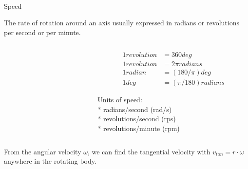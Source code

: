 \subsection{}
{
\begin{frame}{Speed}

The rate of rotation around an axis usually expressed 
in radians or revolutions per second or per minute.

\begin{columns}
\begin{column}{0.5\textwidth}  %

	\vspace{-3mm}
   	\begin{figure}
 	\end{figure}

\end{column}

\begin{column}{0.5\textwidth}
\begin{equation*}
\begin{split}
1 revolution & = 360 deg \\
1 revolution & = 2 \pi radians \\
1 radian & = (180/ \pi) deg \\
1 deg & = (\pi / 180) radians
\end{split}
\end{equation*}

Units of speed: \\
* radians/second (rad/s) \\
* revolutions/second (rps) \\
* revolutions/minute (rpm) 
\end{column}


\end{columns}


From the angular velocity $\omega$, we can find the tangential velocity
with $v_{tan}= r \cdot \omega$ anywhere in the rotating body.

\end{frame}
}



